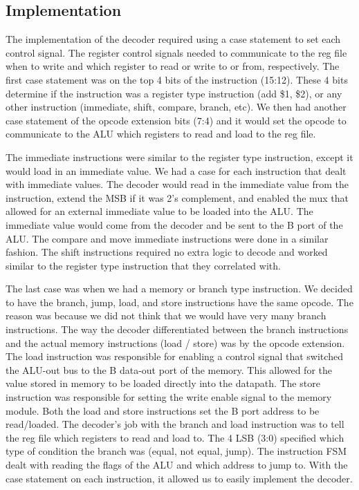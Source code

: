 \documentclass[11pt]{article}
\begin{document}
\subsection{Implementation}
The implementation of the decoder required using a case statement to set each control signal. The register control signals needed to communicate to the reg file when to write and which register to read or write to or from, respectively. The first case statement was on the top 4 bits of the instruction (15:12). These 4 bits determine if the instruction was a register type instruction (add \$1, \$2), or any other instruction (immediate, shift, compare, branch, etc). We then had another case statement of the opcode extension bits (7:4) and it would set the opcode to communicate to the ALU which registers to read and load to the reg file.

The immediate instructions were similar to the register type instruction, except it would load in an immediate value. We had a case for each instruction that dealt with immediate values. The decoder would read in the immediate value from the instruction, extend the MSB if it was 2’s complement, and enabled the mux that allowed for an external immediate value to be loaded into the ALU. The immediate value would come from the decoder and be sent to the B port of the ALU. The compare and move immediate instructions were done in a similar fashion. The shift instructions required no extra logic to decode and worked similar to the register type instruction that they correlated with.

The last case was when we had a memory or branch type instruction. We decided to have the branch, jump, load, and store instructions have the same opcode. The reason was because we did not think that we would have very many branch instructions. The way the decoder differentiated between the branch instructions and the actual memory instructions (load / store) was by the opcode extension. The load instruction was responsible for enabling a control signal that switched the ALU-out bus to the B data-out port of the memory. This allowed for the value stored in memory to be loaded directly into the datapath. The store instruction was responsible for setting the write enable signal to the memory module. Both the load and store instructions set the B port address to be read/loaded. The decoder’s job with the branch and load instruction was to tell the reg file which registers to read and load to. The 4 LSB (3:0) specified which type of condition the branch was (equal, not equal, jump). The instruction FSM dealt with reading the flags of the ALU and which address to jump to. With the case statement on each instruction, it allowed us to easily implement the decoder.
\end{document}
